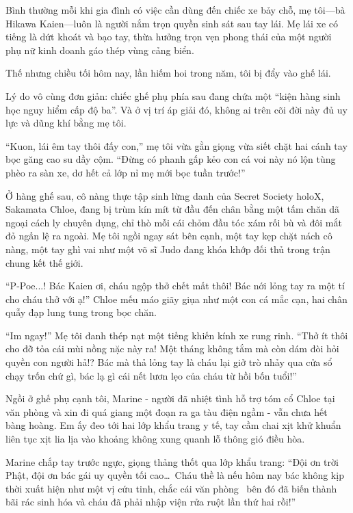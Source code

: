 \documentclass[../main.tex]{subfiles}
\begin{document}


Bình thường mỗi khi gia đình có việc cần dùng đến chiếc xe bảy chỗ, mẹ tôi—bà Hikawa Kaien—luôn là người nắm trọn quyền sinh sát sau tay lái. Mẹ lái xe có tiếng là dứt khoát và bạo tay, thừa hưởng trọn vẹn phong thái của một người phụ nữ kinh doanh gáo thép vùng cảng biển.

Thế nhưng chiều tối hôm nay, lần hiếm hoi trong năm, tôi bị đẩy vào ghế lái.

Lý do vô cùng đơn giản: chiếc ghế phụ phía sau đang chứa một ``kiện hàng sinh học nguy hiểm cấp độ ba''. Và ở vị trí áp giải đó, không ai trên cõi đời này đủ uy lực và dũng khí bằng mẹ tôi.

``Kuon, lái êm tay thôi đấy con,'' mẹ tôi vừa gằn giọng vừa siết chặt hai cánh tay bọc găng cao su dầy cộm. ``Đừng có phanh gấp kẻo con cá voi này nó lộn tùng phèo ra sàn xe, dơ hết cả lớp nỉ mẹ mới bọc tuần trước!''

Ở hàng ghế sau, cô nàng thực tập sinh lừng danh của Secret Society holoX, Sakamata Chloe, đang bị trùm kín mít từ đầu đến chân bằng một tấm chăn dã ngoại cách ly chuyên dụng, chỉ thò mỗi cái chỏm đầu tóc xám rối bù và đôi mắt đỏ ngấn lệ ra ngoài. Mẹ tôi ngồi ngay sát bên cạnh, một tay kẹp chặt nách cô nàng, một tay ghì vai như một võ sĩ Judo đang khóa khớp đối thủ trong trận chung kết thế giới.

``P-Poe...! Bác Kaien ơi, cháu ngộp thở chết mất thôi! Bác nới lỏng tay ra một tí cho cháu thở với ạ!'' Chloe mếu máo giãy giụa như một con cá mắc cạn, hai chân quẫy đạp lung tung trong bọc chăn.

``Im ngay!'' Mẹ tôi đanh thép nạt một tiếng khiến kính xe rung rinh. ``Thở ít thôi cho đỡ tỏa cái mùi nồng nặc này ra! Một tháng không tắm mà còn dám đòi hỏi quyền con người hả!? Bác mà thả lỏng tay là cháu lại giở trò nhảy qua cửa sổ chạy trốn chứ gì, bác lạ gì cái nết lươn lẹo của cháu từ hồi bốn tuổi!''

Ngồi ở ghế phụ cạnh tôi, Marine - người đã nhiệt tình hỗ trợ tóm cổ Chloe tại văn phòng và xin đi quá giang một đoạn ra ga tàu điện ngầm - vẫn chưa hết bàng hoàng. Em ấy đeo tới hai lớp khẩu trang y tế, tay cầm chai xịt khử khuẩn liên tục xịt lia lịa vào khoảng không xung quanh lỗ thông gió điều hòa.

Marine chắp tay trước ngực, giọng thảng thốt qua lớp khẩu trang: ``Đội ơn trời Phật, đội ơn bác gái uy quyền tối cao\dots\ Cháu thề là nếu hôm nay bác không kịp thời xuất hiện như một vị cứu tinh, chắc cái văn phòng \hll\ bên đó đã biến thành bãi rác sinh hóa và cháu đã phải nhập viện rửa ruột lần thứ hai rồi!''
\end{document}

